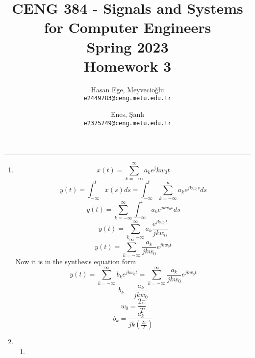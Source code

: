 \documentclass[10pt,a4paper, margin=1in]{article}
\author{
  Hasan Ege, Meyvecioğlu\\
  \texttt{e2449783@ceng.metu.edu.tr}
  \and
  Enes, Şanlı\\
  \texttt{e2375749@ceng.metu.edu.tr}
}
\title{CENG 384 - Signals and Systems for Computer Engineers \\
Spring 2023 \\
Homework 3}
\begin{document}
\maketitle



\noindent\rule{19cm}{1.2pt}

\begin{enumerate}

\item %
\begin{equation}
    x(t) = \sum_{k=-\infty}^{\infty} a_ke^jkw_0t
\end{equation}
\begin{equation}
    y(t) = \int_{-\infty}^t x(s)ds = \int_{-\infty}^t \sum_{k = -\infty}^{\infty}a_ke^{jkw_0s}ds
\end{equation}
\begin{equation}
    y(t) = \sum_{k = -\infty}^{\infty} \int_{-\infty}^t a_ke^{jkw_0s}ds
\end{equation}
\begin{equation}
    y(t) = \sum_{k = -\infty}^{\infty}a_k\frac{e^{jkw_0t}}{jkw_0}
\end{equation}
\begin{equation}
    y(t) = \sum_{k = -\infty}^{\infty}\frac{a_k}{jkw_0}e^{jkw_0t}
\end{equation}
Now it is in the synthesis equation form
\begin{equation}
    y(t) = \sum_{k=-\infty}^{\infty} b_ke^{jkw_0t }= \sum_{k = -\infty}^{\infty}\frac{a_k}{jkw_0}e^{jkw_0t}
\end{equation}
\begin{equation}
    b_k = \frac{a_k}{jkw_0}
\end{equation}
\begin{equation}
    w_0 = \frac{2\pi}{T}
\end{equation}
\begin{equation}
    b_k = \frac{a_k}{jk(\frac{2\pi}{T})}
\end{equation}
\item %
	\begin{enumerate}
    \item
    

\end{enumerate}
\end{enumerate}
\end{document}

